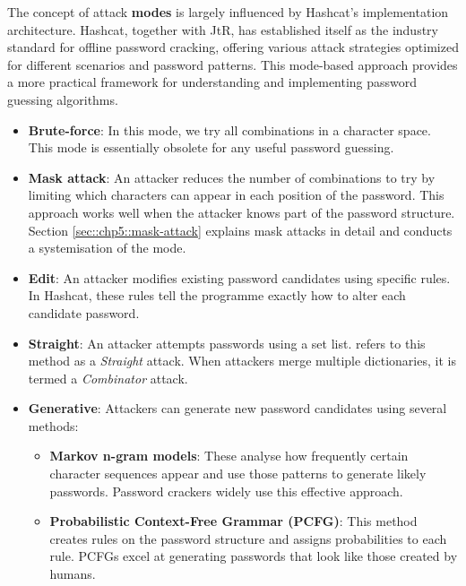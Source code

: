 The concept of attack \textbf{modes} is largely influenced by Hashcat's implementation architecture. Hashcat, together with JtR, has established itself as the industry standard for offline password cracking, offering various attack strategies optimized for different scenarios and password patterns. This mode-based approach provides a more practical framework for understanding and implementing password guessing algorithms.

\begin{itemize}
    \item \textbf{Brute-force}: In this mode, we try all combinations in a character space. This mode is essentially obsolete for any useful password guessing.
    
    \item \textbf{Mask attack}: An attacker reduces the number of combinations to try by limiting which characters can appear in each position of the password. This approach works well when the attacker knows part of the password structure. Section \ref{sec::chp5::mask-attack} explains mask attacks in detail and conducts a systemisation of the mode.
    
    \item \textbf{Edit}: An attacker modifies existing password candidates using specific rules. In Hashcat, these rules tell the programme exactly how to alter each candidate password.

    \item \textbf{Straight}: An attacker attempts passwords using a set list. \hashcat refers to this method as a \textit{Straight} attack. When attackers merge multiple dictionaries, it is termed a \textit{Combinator} attack.
    
    \item \textbf{Generative}: Attackers can generate new password candidates using several methods:
    
    \begin{itemize}
        \item \textbf{Markov n-gram models}: These analyse how frequently certain character sequences appear and use those patterns to generate likely passwords. Password crackers widely use this effective approach.
        
        \item \textbf{Probabilistic Context-Free Grammar (PCFG)}: This method creates rules on the password structure and assigns probabilities to each rule. PCFGs excel at generating passwords that look like those created by humans.
        

\end{itemize}
\end{itemize}
